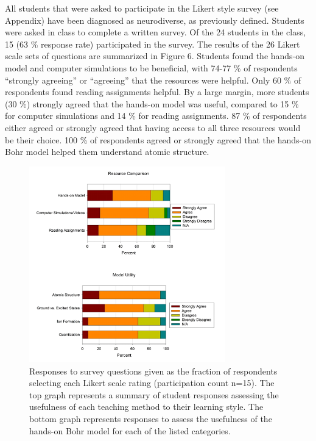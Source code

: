 \documentclass[11pt]{sig-alternate}
\begin{document}
\begin{large}
All students that were asked to participate in the Likert style survey (see Appendix) have been diagnosed as neurodiverse, as previously defined.  Students were asked in class to complete a written survey.  Of the 24 students in the class, 15 (63 \% response rate) participated in the survey.  The results of the 26 Likert scale sets of questions are summarized in Figure 6.  Students found the hands-on model and computer simulations to be beneficial, with 74-77 \% of respondents “strongly agreeing” or “agreeing” that the resources were helpful. Only 60 \% of respondents found reading assignments helpful.  By a large margin, more students (30 \%) strongly agreed that the hands-on model was useful, compared to 15 \% for computer simulations and 14 \% for reading assignments.  87 \% of respondents either agreed or strongly agreed that having access to all three resources would be their choice.  100 \% of respondents agreed or strongly agreed that the hands-on Bohr model helped them understand atomic structure.
\begin{figure}[htp]
    \leftmargin
    \includegraphics[width=8.5cm]{Figure6.png}
    \caption{Responses to survey questions given as the fraction of respondents selecting each Likert scale rating (participation count n=15).  The top graph represents a summary of student responses assessing the usefulness of each teaching method to their learning style. The bottom graph represents responses to assess the usefulness of the hands-on Bohr model for each of the listed categories.}
    \label{Responses to survey questions }
    \label{The figure shows two horizontal bar charts. The x-axes are “percent” and the y-axes are binned binned categories. The colors of the bars are indicated as: strongly agree (maroon), agree (orange), disagree (yellow), strongly disagree (green), and N/A (blue). The upper chart is titled “Resource Comparison” and the y-axis categories are “Hands-on Model” on the top, “Computer Simulations/Videos” in the middle, and “Reading Assignments” on the bottom.  The lower chart is titled “Model Utility” and the y-axis categories are “Atomic Structure” on the top, “Ground vs. Excited States” below that, “Ion Formation” below that, and “Quantization” on the bottom.}
\end{figure}


\end{large}
\end{document}
